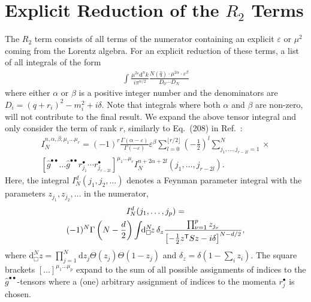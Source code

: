 \documentclass[11pt,a4paper]{refrep}
\begin{document}
\chapter{Explicit Reduction of the $R_2$ Terms}
The $R_2$ term \cite{Ossola:2008xq} consists of all terms of the numerator
containing an explicit $\varepsilon$ or $\mu^2$ coming from the Lorentz
algebra. For an explicit reduction of these terms, a list of all integrals
of the form
\begin{align}
\int\frac{\mu^{2\varepsilon}\mathrm{d}^nk}{i\pi^{n/2}}
\frac{N(\hat{q})\cdot\mu^{2\alpha}\cdot\varepsilon^\beta}{D_0\cdots D_N}
\end{align}
where either $\alpha$ or $\beta$ is a positive integer number
and the denominators are $D_i=(q+r_i)^2-m_i^2+i\delta$.
Note that integrals where both $\alpha$ and $\beta$ are
non-zero, will not contribute to the final result.
We expand the above tensor integral and only consider the term
of rank $r$, similarly to Eq.~(208) in Ref.~\cite{Reiter:2009kb}:
\begin{multline}
I_N^{n,\alpha,\beta;\mu_1\ldots\mu_r}=
(-1)^{r}\frac{\Gamma(\alpha-\varepsilon)}{\Gamma(-\varepsilon)}
\varepsilon^\beta
\sum_{l=0}^{\lfloor r/2\rfloor}\left(-\frac12\right)^l
\sum_{j_1,\ldots,j_{r-2l}=1}^N
\times\\
\left[\hat{g}^{\bullet\bullet}\ldots
\hat{g}^{\bullet\bullet}r_{j_1}^\bullet
\cdots r_{j_{r-2l}}^\bullet\right]^{\mu_1\ldots\mu_r}
I_N^{n+2\alpha+2l}(j_1,\ldots,j_{r-2l}).
\end{multline}
Here, the integral $I_N^d(j_1,j_2,\ldots)$ denotes a Feynman parameter
integral with the parameters $z_{j_1}, z_{j_2}, \ldots$ in the numerator,
\begin{multline}
I_N^d(j_1,\ldots, j_p)=\\
(-1)^N\Gamma\left(N-\frac{d}2\right)%
\int\!\!\mathrm{d}^N_\Box\!z\,\delta_z
\frac{\prod_{\nu=1}^p z_{j_\nu}}{%
\left[-\frac12 z^{\mathsf{T}}Sz-i\delta\right]^{N-d/2}},
\end{multline}
where $\mathrm{d}^N_\Box\!z=
\prod_{j=1}^N\mathrm{d}z_j\Theta(z_j)\Theta(1-z_j)$
and $\delta_z=\delta(1-\sum_i z_i)$.
The square brackets $[\ldots]^{\mu_1\ldots\mu_p}$ expand to the sum of
all possible assignments of indices to the $\hat{g}^{\bullet\bullet}$-tensors
where a (one) arbitrary assignment of indices to the momenta $r_j^\bullet$
is chosen.
\end{document}
